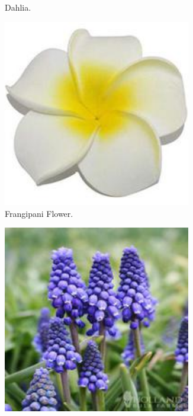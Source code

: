 \begin{figure}
\begin{subfigure}{0.24\textwidth}
        \caption{Dahlia.}
    \end{subfigure}
    \vspace{0.07cm}
    \begin{subfigure}{0.24\textwidth}
        \centering
        \includegraphics[width=0.9\textwidth]{../example_images/FrangipaniFlower.jpg}
        \caption{Frangipani Flower.}
    \end{subfigure}
    \vspace{0.07cm}
    \begin{subfigure}{0.24\textwidth}
        \centering
        \includegraphics[width=0.9\textwidth]{../example_images/GrapeHyacinth.jpg}

\end{subfigure}
\end{figure}
